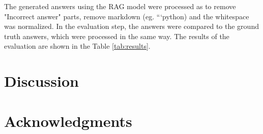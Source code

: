 \documentclass[fleqn,moreauthors,10pt]{ds_report}
\begin{document}
The generated answers using the RAG model were processed as to remove "Incorrect answer" parts, remove markdown (eg. ```python) and the whitespace was normalized. In the evaluation step, the answers were compared to the ground truth answers, which were processed in the same way. The results of the evaluation are shown in the Table \ref{tab:results}.







\section*{Discussion}


\section*{Acknowledgments}



\end{document}
